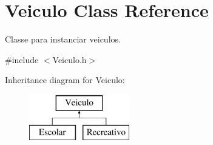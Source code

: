 \hypertarget{class_veiculo}{}\section{Veiculo Class Reference}
\label{class_veiculo}


Classe para instanciar veiculos.  




{\ttfamily \#include $<$Veiculo.\+h$>$}

Inheritance diagram for Veiculo\+:\begin{figure}[H]
\begin{center}
\leavevmode
\includegraphics[height=2.000000cm]{class_veiculo}
\end{center}
\end{figure}
